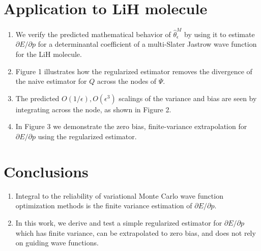 \documentclass{article}
\begin{document}
\section{Application to LiH molecule}
\begin{enumerate}
\item We verify the predicted mathematical behavior of $\hat{\theta}_\epsilon^M$ by using it to estimate $\partial E/\partial p$ for a determinantal coefficient of a multi-Slater Jastrow wave function for the LiH molecule.

\item Figure 1 illustrates how the regularized estimator removes the divergence of the naive estimator for $Q$ across the nodes of $\Psi$.

\item The predicted $O(1/\epsilon), O(\epsilon^3)$ scalings of the variance and bias are seen by integrating across the node, as shown in Figure 2. 

\item In Figure 3 we demonstrate the zero bias, finite-variance extrapolation for $\partial E/\partial p$ using the regularized estimator.
\end{enumerate}

\section{Conclusions}
\begin{enumerate}
\item Integral to the reliability of variational Monte Carlo wave function optimization methods is the finite variance estimation of $\partial E/\partial p$.

\item  In this work, we derive and test a simple regularized estimator for $\partial E/\partial p$ which has finite variance, can be extrapolated to zero bias, and does not rely on guiding wave functions.
\end{enumerate}



\end{document}
